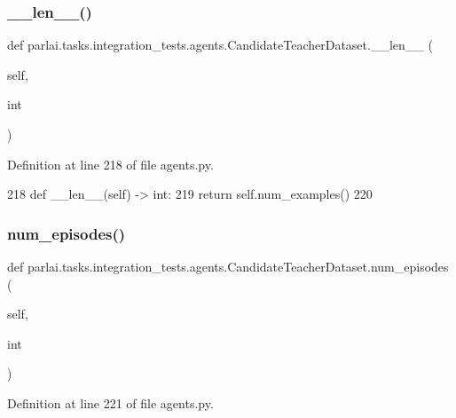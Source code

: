 \subsubsection{\texorpdfstring{\+\_\+\+\_\+len\+\_\+\+\_\+()}{\_\_len\_\_()}}
{\footnotesize\ttfamily def parlai.\+tasks.\+integration\+\_\+tests.\+agents.\+Candidate\+Teacher\+Dataset.\+\_\+\+\_\+len\+\_\+\+\_\+ (\begin{DoxyParamCaption}\item[{}]{self,  }\item[{}]{int }\end{DoxyParamCaption})}



Definition at line 218 of file agents.\+py.


\begin{DoxyCode}
218     \textcolor{keyword}{def }\_\_len\_\_(self) -> int:
219         \textcolor{keywordflow}{return} self.num\_examples()
220 
\end{DoxyCode}
\mbox{\label{classparlai_1_1tasks_1_1integration__tests_1_1agents_1_1CandidateTeacherDataset_a8a3d8af8f189066f56bf5ae1848389c3}} 
\subsubsection{\texorpdfstring{num\+\_\+episodes()}{num\_episodes()}}
{\footnotesize\ttfamily def parlai.\+tasks.\+integration\+\_\+tests.\+agents.\+Candidate\+Teacher\+Dataset.\+num\+\_\+episodes (\begin{DoxyParamCaption}\item[{}]{self,  }\item[{}]{int }\end{DoxyParamCaption})}



Definition at line 221 of file agents.\+py.


